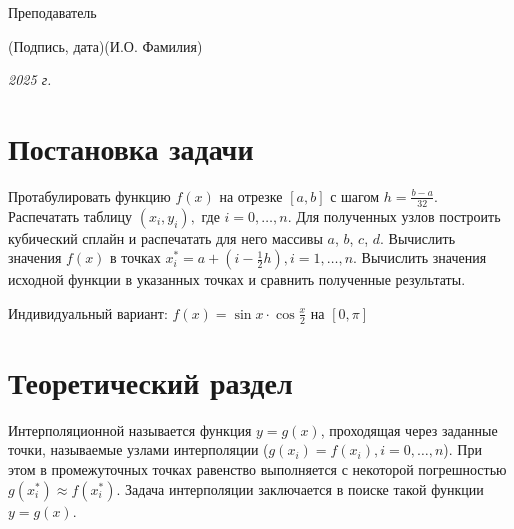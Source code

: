 \documentclass[14pt, russian]{scrartcl}
\begin{document}
\begin{titlepage}
	\bigskip

	\noindent Преподаватель  \hfill \underline{\hspace{4cm}}\quad

	\vspace{-2ex}
	\noindent\hspace{13.5ex}\normalsize\hspace{170pt}\hspace{2ex}\scriptsize{(Подпись, дата)}\normalsize\hspace{30pt}\hspace{6ex}\scriptsize{(И.О. Фамилия)}\normalsize

	\bigskip




	\begin{center}
		\textsl{2025 г.}
	\end{center}
\end{titlepage}


\setlength{\tabcolsep}{3pt}
\newpage
\setcounter{page}{2}

\newpage
\section{Постановка задачи}

Протабулировать функцию $f(x)$ на отрезке $[a, b]$ с шагом $h = \frac{b-a}{32}$.
Распечатать таблицу $(x_{i}, y_{i}),$ где $i = 0, \ldots{}, n$. Для полученных
узлов построить кубический сплайн и распечатать для него массивы $a$, $b$, $c$,
$d$. Вычислить значения $f(x)$ в точках
$x_{i}^{*} = a + (i - \frac{1}{2}h), i = 1, \ldots{}, n$. Вычислить значения
исходной функции в указанных точках и сравнить полученные результаты.

Индивидуальный вариант: $f(x) = \sin{x} \cdot \cos{\frac{x}{2}}$ на $[0, \pi]$

\section{Теоретический раздел}

Интерполяционной называется функция $y = g(x)$, проходящая через заданные точки,
называемые узлами интерполяции ($g(x_{i}) = f(x_{i}), i = 0, \ldots{}, n$). При
этом в промежуточных точках равенство выполняется с некоторой погрешностью
$g(x_{i}^{*}) \approx f(x_{i}^{*})$. Задача интерполяции заключается в поиске
такой функции $y = g(x)$.
\end{document}
